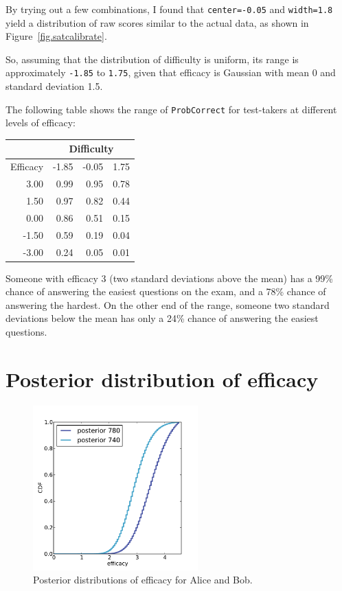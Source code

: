 \documentclass[12pt]{book}
\theoremstyle{exercise}
\begin{document}
By trying out a few combinations, I found that
{\tt center=-0.05} and {\tt width=1.8} yield a distribution
of raw scores similar to the actual data, as shown in
Figure~\ref{fig.satcalibrate}.

So, assuming that the distribution of difficulty is uniform,
its range is approximately
{\tt -1.85} to {\tt 1.75}, given that
efficacy is Gaussian with mean 0 and standard deviation 1.5.

The following table shows the range of {\tt ProbCorrect} for
test-takers at different levels of efficacy:

\begin{tabular}{|r|r|r|r|}
\hline
           & \multicolumn{3}{|c|}{Difficulty} \\
\hline
Efficacy   & -1.85   &   -0.05   &      1.75  \\
\hline
3.00 &  0.99 &  0.95 &  0.78   \\
1.50 &  0.97 &  0.82 &  0.44   \\
0.00 &  0.86 &  0.51 &  0.15   \\
-1.50 &  0.59 &  0.19 &  0.04   \\
-3.00 &  0.24 &  0.05 &  0.01   \\
\hline
\end{tabular}

Someone with efficacy 3 (two standard deviations above
the mean) has a 99\% chance of answering the easiest questions on
the exam, and a 78\% chance of answering the hardest.  On the other
end of the range, someone two standard deviations below the mean
has only a 24\% chance of answering the easiest questions.


\section{Posterior distribution of efficacy}

\begin{figure}
\centerline{\includegraphics[height=2.5in]{figs/sat_posteriors_eff.pdf}}
\caption{Posterior distributions of efficacy for Alice and Bob.}
\label{fig.satposterior2}
\end{figure}
\end{document}
